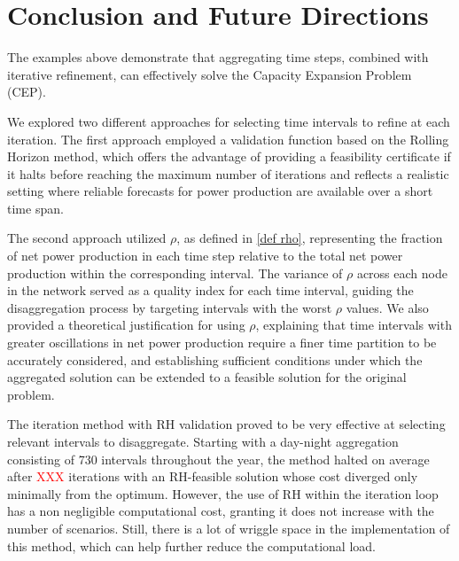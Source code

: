 \documentclass[smallextended,natbib]{svjour3}       %
\numberwithin{theorem}{section}
\begin{document}








\section{Conclusion and Future Directions}

The examples above demonstrate that aggregating time steps, combined with iterative refinement, can effectively solve the Capacity Expansion Problem (CEP). 

We explored two different approaches for selecting time intervals to refine at each iteration. The first approach employed a validation function based on the Rolling Horizon method, which offers the advantage of providing a feasibility certificate if it halts before reaching the maximum number of iterations and reflects a realistic setting where reliable forecasts for power production are available over a short time span.

The second approach utilized \(\rho\), as defined in \ref{def rho}, representing the fraction of net power production in each time step relative to the total net power production within the corresponding interval. 
The variance of \(\rho\) across each node in the network served as a quality index for each time interval, guiding the disaggregation process by targeting intervals with the worst \(\rho\) values. 
We also provided a theoretical justification for using \(\rho\), explaining that time intervals with greater oscillations in net power production require a finer time partition to be accurately considered, and establishing sufficient conditions under which the aggregated solution can be extended to a feasible solution for the original problem.

The iteration method with RH validation proved to be very effective at selecting relevant intervals to disaggregate. Starting with a day-night aggregation consisting of 730 intervals throughout the year, the method halted on average after \textcolor{red}{XXX} iterations with an RH-feasible solution whose cost diverged only minimally from the optimum.
However, the use of RH within the iteration loop has a non negligible computational cost, granting it does not increase with the number of scenarios. Still, there is a lot of wriggle space in the implementation of this method, which can help further reduce the computational load.
\end{document}
